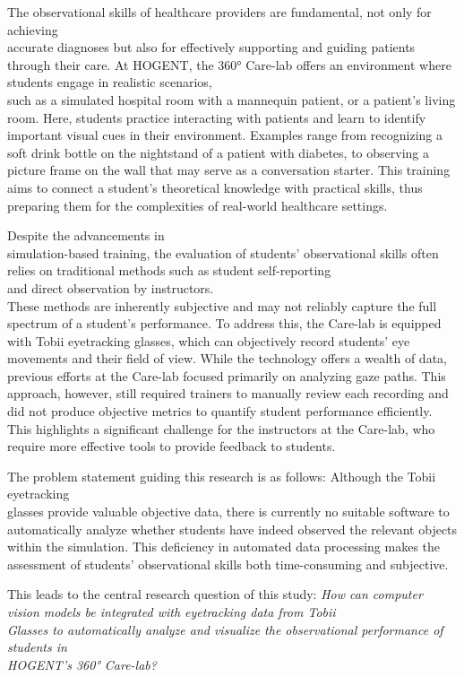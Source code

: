 \documentclass[english]{hogent-article}
\begin{document}
The observational skills of healthcare providers are fundamental, not only for achieving\\ accurate diagnoses but also for effectively supporting and guiding patients through their care.
At HOGENT, the 360° Care-lab offers an environment where students engage in realistic scenarios,\\ such as a simulated hospital room with a mannequin patient, or a patient's living room.
Here, students practice interacting with patients and learn to identify important visual cues in their environment.
Examples range from recognizing a soft drink bottle on the nightstand of a patient with diabetes, to observing a picture frame on the wall that may serve as a conversation starter.
This training aims to connect a student's theoretical knowledge with practical skills, thus preparing them for the complexities of real-world healthcare settings.

Despite the advancements in\\ simulation-based training, the evaluation of students' observational skills often relies on traditional methods such as student self-reporting\\ and direct observation by instructors.\\
These methods are inherently subjective and may not reliably capture the full spectrum of a student's performance.
To address this, the Care-lab is equipped with Tobii eyetracking glasses, which can objectively record students' eye movements and their field of view. 
While the technology offers a wealth of data, previous efforts at the Care-lab focused primarily on analyzing gaze paths.
This approach, however, still required trainers to manually review each recording and did not produce objective metrics to quantify student performance efficiently.
This highlights a significant challenge for the instructors at the Care-lab, who require more effective tools to provide feedback to students.

The problem statement guiding this research is as follows: Although the Tobii eyetracking\\ glasses provide valuable objective data, there is currently no suitable software to automatically analyze whether
students have indeed observed the relevant objects within the simulation. This deficiency in automated data processing makes the assessment of students' observational skills both time-consuming and subjective.

This leads to the central research question of this study:
\textit{How can computer vision models be integrated with eyetracking data from Tobii\\ Glasses to automatically analyze and visualize the observational performance of students in\\ HOGENT's 360° Care-lab?}
\end{document}
